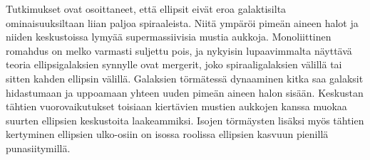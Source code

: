 \documentclass[12pt,a4paper]{article}
\begin{document}
Tutkimukset ovat osoittaneet, että ellipsit eivät eroa galaktisilta ominaisuuksiltaan liian paljoa spiraaleista. Niitä ympäröi pimeän aineen halot ja niiden keskustoissa lymyää supermassiivisia mustia aukkoja. Monoliittinen romahdus on melko varmasti suljettu pois, ja nykyisin lupaavimmalta näyttävä teoria ellipsigalaksien synnylle ovat mergerit, joko spiraaligalaksien välillä tai sitten kahden ellipsin välillä. Galaksien törmätessä dynaaminen kitka saa galaksit hidastumaan ja uppoamaan yhteen uuden pimeän aineen halon sisään. Keskustan tähtien vuorovaikutukset toisiaan kiertävien mustien aukkojen kanssa muokaa suurten ellipsien keskustoita laakeammiksi. Isojen törmäysten lisäksi myös tähtien kertyminen ellipsien ulko-osiin on isossa roolissa ellipsien kasvuun pienillä punasiitymillä.

\newpage
\clearpage



 
 
 
 
 
 
 
 
 
\end{document}

